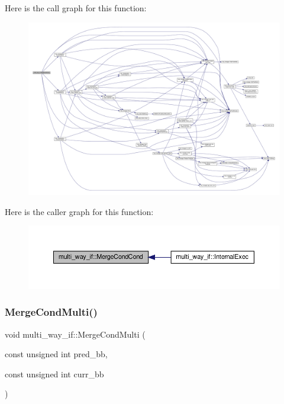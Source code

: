 Here is the call graph for this function\+:
\nopagebreak
\begin{figure}[H]
\begin{center}
\leavevmode
\includegraphics[width=350pt]{dd/dca/classmulti__way__if_ae7810fa463c0f83a9a3e3b274a832582_cgraph}
\end{center}
\end{figure}
Here is the caller graph for this function\+:
\nopagebreak
\begin{figure}[H]
\begin{center}
\leavevmode
\includegraphics[width=350pt]{dd/dca/classmulti__way__if_ae7810fa463c0f83a9a3e3b274a832582_icgraph}
\end{center}
\end{figure}
\mbox{\label{classmulti__way__if_ad207368bda4ed43c0b73088848d2521f}} 
\subsubsection{\texorpdfstring{Merge\+Cond\+Multi()}{MergeCondMulti()}}
{\footnotesize\ttfamily void multi\+\_\+way\+\_\+if\+::\+Merge\+Cond\+Multi (\begin{DoxyParamCaption}\item[{const unsigned int}]{pred\+\_\+bb,  }\item[{const unsigned int}]{curr\+\_\+bb }\end{DoxyParamCaption})\hspace{0.3cm}{\ttfamily [private]}}



